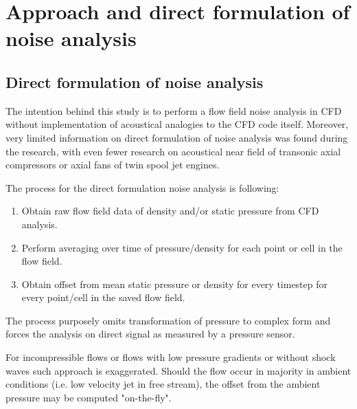 
\chapter{Approach and direct formulation of noise analysis} %

\label{approach} %


\section{Direct formulation of noise analysis} \label{direct_approach}
The intention behind this study is to perform a flow field noise analysis in CFD without implementation of acoustical analogies to the CFD code itself. Moreover, very limited information on direct formulation of noise analysis was found during the research, with even fewer research on acoustical near field of transonic axial compressors or axial fans of twin spool jet engines.

The process for the direct formulation noise analysis is following:
\begin{enumerate}
\item Obtain raw flow field data of density and/or static pressure from CFD analysis.
\item Perform averaging over time of pressure/density for each point or cell in the flow field.
\item Obtain offset from mean static pressure or density for every timestep for every point/cell in the saved flow field.		
\end{enumerate}

The process purposely omits transformation of pressure to complex form and forces the analysis on direct signal as measured by a pressure sensor.

For incompressible flows or flows with low pressure gradients or without shock waves such approach is exaggerated. Should the flow occur in majority in ambient conditions (i.e. low velocity jet in free stream), the offset from the ambient pressure may be computed "on-the-fly".

